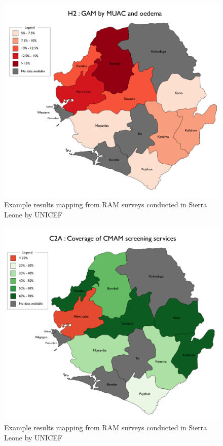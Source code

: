 \documentclass[12pt,a4paper]{article}
\begin{document}
\begin{figure}[H]

{\centering \includegraphics[width=0.7\linewidth]{figures/h2} 

}

\caption{Example results mapping from RAM surveys conducted in Sierra Leone by UNICEF}\label{fig:sampleResults11}
\end{figure}
\begin{figure}[H]

{\centering \includegraphics[width=0.7\linewidth]{figures/c2a} 

}

\caption{Example results mapping from RAM surveys conducted in Sierra Leone by UNICEF}\label{fig:sampleResults12}
\end{figure}
\end{document}
